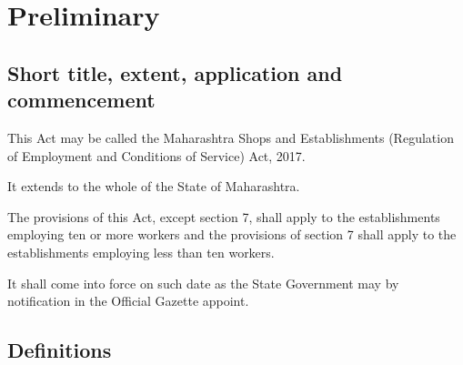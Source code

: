 \documentclass[gaz8,ordinance]{mhact}
\begin{document}
        \chapter{Preliminary} 
        
        \section{Short title, extent, application and commencement} 
        
      \begin{subsectionlist}
    
    \item This Act may be called the Maharashtra Shops and Establishments (Regulation of Employment and Conditions of Service) Act, 2017.
    \item It extends to the whole of the State of Maharashtra.
    \item The provisions of this Act, except section 7, shall apply to the 
establishments employing ten or more workers and the provisions of section 
7 shall apply to the establishments employing less than ten workers.
    \item It shall come into force on such date as the State Government may by 
notification in the Official Gazette appoint.
       \end{subsectionlist}
    
        \section{Definitions} 
        
\end{document}
